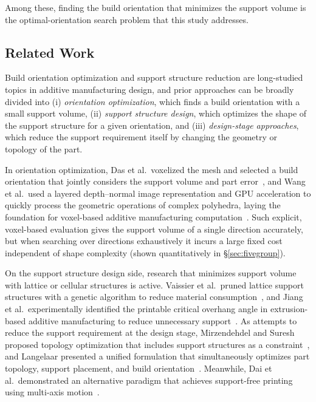 \documentclass[11pt,a4paper]{article}
\begin{document}
Among these, finding the build orientation that minimizes the support volume is the optimal-orientation search problem that this study addresses.

\subsection{Related Work}
\label{sec:related}

Build orientation optimization and support structure reduction are long-studied topics in additive manufacturing design,
and prior approaches can be broadly divided into (i) \emph{orientation optimization}, which finds a build orientation with a small support volume,
(ii) \emph{support structure design}, which optimizes the shape of the support structure for a given orientation,
and (iii) \emph{design-stage approaches}, which reduce the support requirement itself by changing the geometry or topology of the part.

In orientation optimization, Das et al.\ voxelized the mesh and selected a build orientation that jointly considers the support volume and part error~\cite{das2017},
and Wang et al.\ used a layered depth--normal image representation and GPU acceleration to quickly process the geometric operations of complex polyhedra,
laying the foundation for voxel-based additive manufacturing computation~\cite{wang2010}.
Such explicit, voxel-based evaluation gives the support volume of a single direction accurately,
but when searching over directions exhaustively it incurs a large fixed cost independent of shape complexity
(shown quantitatively in \S\ref{sec:fivegroup}).

On the support structure design side, research that minimizes support volume with lattice or cellular structures is active.
Vaissier et al.\ pruned lattice support structures with a genetic algorithm to reduce material consumption~\cite{vaissier2019},
and Jiang et al.\ experimentally identified the printable critical overhang angle in extrusion-based additive manufacturing
to reduce unnecessary support~\cite{jiang2018}.
As attempts to reduce the support requirement at the design stage, Mirzendehdel and Suresh proposed topology optimization
that includes support structures as a constraint~\cite{mirzendehdel2016}, and Langelaar presented a unified formulation that simultaneously optimizes
part topology, support placement, and build orientation~\cite{langelaar2018}.
Meanwhile, Dai et al.\ demonstrated an alternative paradigm that achieves support-free printing using multi-axis motion~\cite{dai2018}.
\end{document}
